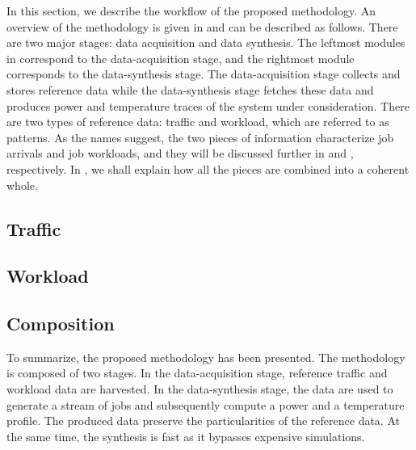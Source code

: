 In this section, we describe the workflow of the proposed methodology. An
overview of the methodology is given in  and can be described
as follows. There are two major stages: data acquisition and data synthesis. The
leftmost modules in  correspond to the data-acquisition stage,
and the rightmost module corresponds to the data-synthesis stage. The
data-acquisition stage collects and stores reference data while the
data-synthesis stage fetches these data and produces power and temperature
traces of the system under consideration. There are two types of reference data:
traffic and workload, which are referred to as patterns. As the names suggest,
the two pieces of information characterize job arrivals and job workloads, and
they will be discussed further in  and ,
respectively. In , we shall explain how all the pieces are
combined into a coherent whole.

\raggedbottom
\subsection{Traffic} 

\makeatletter
\afterpage{\global\let\@textbottom\relax \global\let\@texttop\relax}

\subsection{Workload} 


\subsection{Composition} 


To summarize, the proposed methodology has been presented. The methodology is
composed of two stages. In the data-acquisition stage, reference traffic and
workload data are harvested. In the data-synthesis stage, the data are used to
generate a stream of jobs and subsequently compute a power and a temperature
profile. The produced data preserve the particularities of the reference data.
At the same time, the synthesis is fast as it bypasses expensive simulations.
